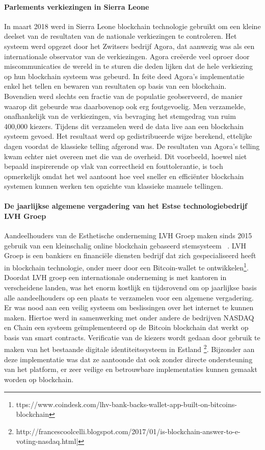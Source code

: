 				\paragraph{Parlements verkiezingen in Sierra Leone}
				In maart 2018 werd in Sierra Leone blockchain technologie gebruikt om een kleine deelset van de resultaten van de nationale verkiezingen te controleren. Het systeem werd opgezet door het Zwitsers bedrijf Agora, dat aanwezig was als een internationale observator van de verkiezingen. Agora creëerde veel oproer door miscommunicaties de wereld in te sturen die  deden lijken dat de hele verkiezing op hun blockchain systeem was gebeurd. In feite deed Agora's implementatie enkel het tellen en bewaren van resultaten op basis van een blockchain. Bovendien werd slechts een fractie van de populatie geobserveerd, de manier waarop dit gebeurde was daarbovenop ook erg foutgevoelig. Men verzamelde, onafhankelijk van de verkiezingen, via bevraging het stemgedrag van ruim 400,000 kiezers. Tijdens dit verzamelen werd de data live aan een blockchain systeem gevoed. Het resultaat werd op gedistribueerde wijze berekend, ettelijke dagen voordat de klassieke telling afgerond was. De resultaten van Agora's telling kwam echter niet overeen met die van de overheid. Dit voorbeeld, hoewel niet bepaald  inspirerende op vlak van correctheid en fouttolerantie, is toch opmerkelijk omdat het wel aantoont hoe veel sneller en efficiënter blockchain systemen kunnen werken ten opzichte van klassieke manuele tellingen. ~\autocite{Kshetri2018}
				
				\paragraph{De jaarlijkse algemene vergadering van het Estse technologiebedrijf LVH Groep}
				Aandeelhouders van de Esthetische onderneming LVH Groep maken sinds 2015 gebruik van een kleinschalig online blockchain gebaseerd stemsysteem ~\autocite{Kshetri2018}. LVH Groep is een bankiers en financiële diensten bedrijf dat zich gespecialiseerd heeft in blockchain technologie, onder meer door een Bitcoin-wallet te ontwikkelen\footnote{ttps://www.coindesk.com/lhv-bank-backs-wallet-app-built-on-bitcoins-blockchain}. Doordat LVH groep een internationale onderneming is met kantoren in verscheidene landen, was het enorm kostlijk en tijdsrovend om op jaarlijkse basis alle aandeelhouders op een plaats te verzamelen voor een algemene vergadering. Er was  nood aan een veilig systeem om beslissingen over het internet te kunnen maken. Hiertoe werd in samenwerking met onder andere de bedrijven NASDAQ en Chain een systeem geïmplementeerd op de Bitcoin blockchain dat werkt op basis van smart contracts. Verificatie van de kiezers wordt gedaan door gebruik te maken van het bestaande digitale identiteitssysteem in Estland \footnote{http://francescoolcelli.blogspot.com/2017/01/is-blockchain-answer-to-e-voting-nasdaq.html|}. Bijzonder aan deze implementatie was dat ze aantoonde dat ook zonder directe ondersteuning van het platform, er zeer veilige en betrouwbare implementaties kunnen gemaakt worden op blockchain. ~\autocite{Kshetri2018}
				
